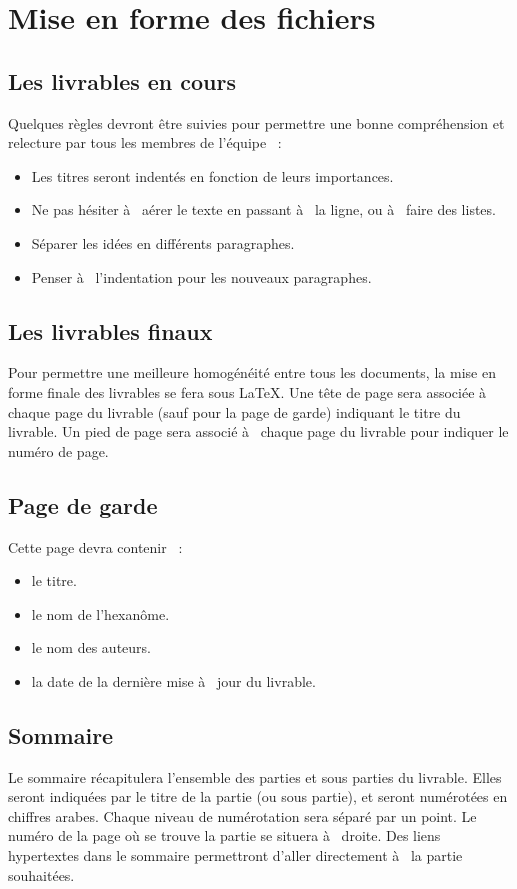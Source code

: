 \section{Mise en forme des fichiers}
\subsection{Les livrables en cours}

    Quelques règles devront être suivies pour permettre une bonne compréhension et relecture par tous les membres de l'équipe  :
\begin{itemize}
    \item Les titres seront indentés en fonction de leurs importances.
    \item Ne pas hésiter à  aérer le texte en passant à  la ligne, ou à  faire des listes.
    \item Séparer les idées en différents paragraphes.
    \item Penser à  l'indentation pour les nouveaux paragraphes.
\end{itemize}

\subsection{Les livrables finaux}
    Pour permettre une meilleure homogénéité entre tous les documents, la mise en forme finale des livrables se fera sous LaTeX. Une tête de page sera associée à  chaque page du livrable (sauf pour la page de garde) indiquant le titre du livrable. Un pied de page sera associé à  chaque page du livrable pour indiquer le numéro de page.


\subsection{Page de garde}
Cette page devra contenir  :
\begin{itemize}
    \item le titre.
    \item le nom de l'hexanôme.
    \item le nom des auteurs.
    \item la date de la dernière mise à  jour du livrable.
\end{itemize}

\subsection{Sommaire}
    Le sommaire récapitulera l'ensemble des parties et sous parties du livrable. Elles seront indiquées par le titre de la partie (ou sous partie), et seront numérotées en chiffres arabes. Chaque niveau de numérotation sera séparé par un point. Le numéro de la page où se trouve la partie se situera à  droite. Des liens hypertextes dans le sommaire permettront d'aller directement à  la partie souhaitées.


